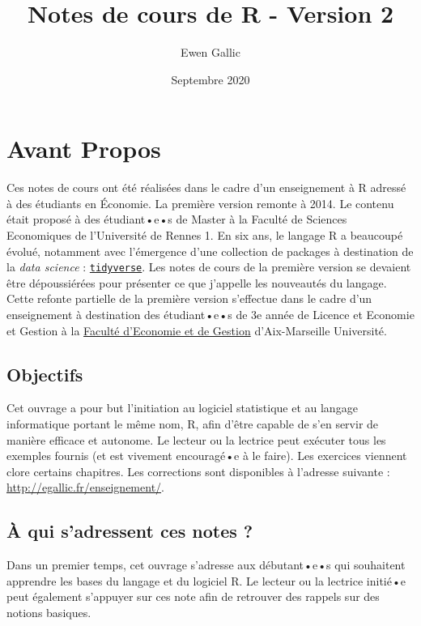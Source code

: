 \documentclass[
  11pt,
]{book}
\title{Notes de cours de R - Version 2}
\author{Ewen Gallic}
\date{Septembre 2020}
\numberwithin{equation}{section}
\numberwithin{countremarque}{section}
\newcounter{exercices}[section]
\begin{document}
\maketitle

{
\hypersetup{linkcolor=}
\setcounter{tocdepth}{3}
\tableofcontents
}
\listoftables
\listoffigures
\hypertarget{avant-propos}{%
\chapter*{Avant Propos}\label{avant-propos}}

Ces notes de cours ont été réalisées dans le cadre d'un enseignement à R adressé à des étudiants en Économie. La première version remonte à 2014. Le contenu était proposé à des étudiant•e•s de Master à la Faculté de Sciences Economiques de l'Université de Rennes 1. En six ans, le langage R a beaucoupé évolué, notamment avec l'émergence d'une collection de packages à destination de la \emph{data science} : \href{https://www.tidyverse.org/}{\texttt{tidyverse}}. Les notes de cours de la première version se devaient être dépoussiérées pour présenter ce que j'appelle les nouveautés du langage. Cette refonte partielle de la première version s'effectue dans le cadre d'un enseignement à destination des étudiant•e•s de 3e année de Licence et Economie et Gestion à la \href{https://feg.univ-amu.fr/}{Faculté d'Economie et de Gestion} d'Aix-Marseille Université.

\hypertarget{objectifs}{%
\section{Objectifs}\label{objectifs}}

Cet ouvrage a pour but l'initiation au logiciel statistique et au langage informatique portant le même nom, R, afin d'être capable de s'en servir de manière efficace et autonome. Le lecteur ou la lectrice peut exécuter tous les exemples fournis (et est vivement encouragé•e à le faire). Les exercices viennent clore certains chapitres. Les corrections sont disponibles à l'adresse suivante : \url{http://egallic.fr/enseignement/}.

\hypertarget{uxe0-qui-sadressent-ces-notes}{%
\section{À qui s'adressent ces notes ?}\label{uxe0-qui-sadressent-ces-notes}}

Dans un premier temps, cet ouvrage s'adresse aux débutant•e•s qui souhaitent apprendre les bases du langage et du logiciel R. Le lecteur ou la lectrice initié•e peut également s'appuyer sur ces note afin de retrouver des rappels sur des notions basiques.
\end{document}
